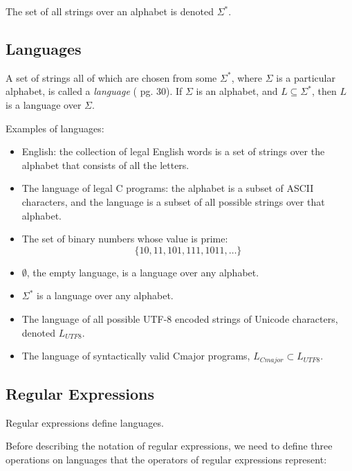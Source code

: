 \documentclass[a4paper,oneside,11pt]{book}
\theoremstyle{definition}
\begin{document}
The set of all strings over an alphabet is denoted $\Sigma^*$.

\subsection{Languages}

A set of strings all of which are chosen from some $\Sigma^*$, where $\Sigma$ is a particular alphabet,
is called a \emph{language} (\cite{AUTOMATA} pg. 30).
If $\Sigma$ is an alphabet, and $L \subseteq \Sigma^*$, then $L$ is a language over $\Sigma$.

Examples of languages:
\begin{itemize}
\item
English: the collection of legal English words is a set of strings over the alphabet that consists of all
the letters.

\item
The language of legal C programs:
the alphabet is a subset of ASCII characters, and the language is a subset of all possible strings over
that alphabet.

\item
The set of binary numbers whose value is prime:
$$\{10, 11, 101, 111, 1011, \ldots\}$$

\item
$\emptyset$, the empty language, is a language over any alphabet.

\item
$\Sigma^*$ is a language over any alphabet.

\item
The language of all possible UTF-8 encoded strings of Unicode characters, denoted $L_{UTF8}$.

\item
The language of syntactically valid Cmajor programs, $L_{Cmajor} \subset L_{UTF8}$.
\end{itemize}

\subsection{Regular Expressions}

Regular expressions define languages.

Before describing the notation of regular expressions,
we need to define three operations on languages that the operators of regular expressions represent:
\end{document}

